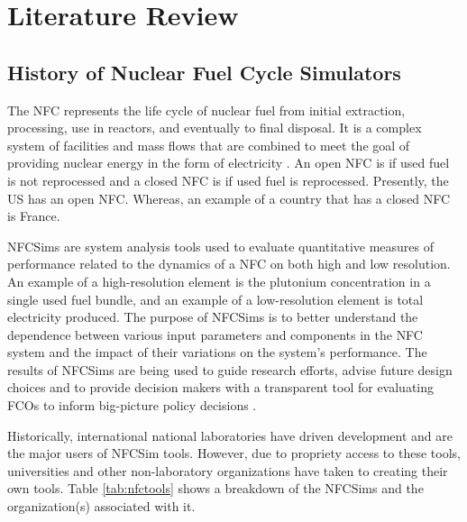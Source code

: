 \chapter[chapter 2]{Literature Review}

\section{History of Nuclear Fuel Cycle Simulators}
The \gls{NFC} represents the life cycle of nuclear fuel from initial
extraction, processing, use in reactors, and eventually to 
final disposal.
It is a complex system of facilities and mass flows 
that are combined to meet the goal of providing nuclear energy 
in the 
form of electricity \cite{yacout_modeling_2005}.
An open \gls{NFC} is if used fuel is not reprocessed and a 
closed \gls{NFC} is if used fuel is reprocessed. 
Presently, the \gls{US} has an open \gls{NFC}. 
Whereas, an example of a country that has a 
closed \gls{NFC} is France. 

\glspl{NFCSim} are system analysis tools used to evaluate 
quantitative measures of performance related to the dynamics of 
a \gls{NFC} on both high and low resolution. 
An example of a high-resolution element is the plutonium 
concentration in a single used fuel bundle, and an example 
of a low-resolution element is total electricity produced. 
The purpose of \glspl{NFCSim} is to better understand the 
dependence between various input parameters and components 
in the \gls{NFC} system and the impact of their variations on 
the system's performance. 
The results of \glspl{NFCSim} are being used to guide research 
efforts, advise future design choices and to provide 
decision makers with a transparent tool for evaluating \glspl{FCO} 
to inform big-picture policy decisions \cite{yacout_modeling_2005}.

Historically, international national laboratories have driven 
development and are the major users of \gls{NFCSim} tools. 
However, due to propriety access to these tools, universities and 
other non-laboratory organizations have taken to creating their 
own tools. 
Table \ref{tab:nfctools} shows a breakdown of the \glspl{NFCSim}
and the organization(s) associated with it. 

